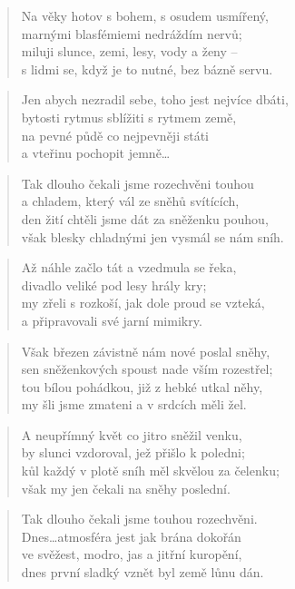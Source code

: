 \documentclass{book}
\begin{document}
\begin{verse}
Na věky hotov s bohem, s osudem usmířený,\\
marnými blasfémiemi nedráždím nervů;\\
miluji slunce, zemi, lesy, vody a ženy --\\
s lidmi se, když je to nutné, bez bázně servu.
\end{verse}
\begin{verse}
Jen abych nezradil sebe, toho jest nejvíce dbáti,\\
bytosti rytmus sblížiti s rytmem země,\\
na pevné půdě co nejpevněji státi\\
a vteřinu pochopit jemně\ldots
\end{verse}
\newpage
{}
\begin{verse}
Tak dlouho čekali jsme rozechvěni touhou\\
a chladem, který vál ze sněhů svítících,\\
den žití chtěli jsme dát za sněženku pouhou,\\
však blesky chladnými jen vysmál se nám sníh.
\end{verse}
\begin{verse}
Až náhle začlo tát a vzedmula se řeka,\\
divadlo veliké pod lesy hrály kry;\\
my zřeli s rozkoší, jak dole proud se vzteká,\\
a připravovali své jarní mimikry.
\end{verse}
\begin{verse}
Však březen závistně nám nové poslal sněhy,\\
sen sněženkových spoust nade vším rozestřel;\\
tou bílou pohádkou, již z hebké utkal něhy,\\
my šli jsme zmateni a v srdcích měli žel.
\end{verse}
\begin{verse}
A neupřímný květ co jitro sněžil venku,\\
by slunci vzdoroval, jež přišlo k poledni;\\
kůl každý v plotě sníh měl skvělou za čelenku;\\
však my jen čekali na sněhy poslední.
\end{verse}
\begin{verse}
Tak dlouho čekali jsme touhou rozechvěni.\\
Dnes\ldots atmosféra jest jak brána dokořán\\
ve svěžest, modro, jas a jitřní kuropění,\\
dnes první sladký vznět byl země lůnu dán.
\end{verse}
\end{document}

